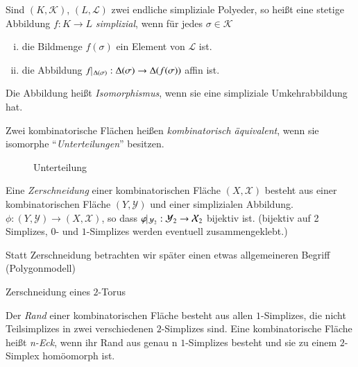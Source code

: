 \documentclass[a4paper,10pt]{scrartcl}
\begin{document}
\begin{df}
 Sind $(K, \mathcal K)$, $(L, \mathcal L)$ zwei endliche simpliziale Polyeder, so heißt eine stetige Abbildung $f: K \to L$ \emph{simplizial}, wenn für jedes $\sigma\in \mathcal K$
\begin{enumerate}[(i)]
 \item die Bildmenge $f(\sigma)$ ein Element von $\mathcal L$ ist.
 \item die Abbildung $f\vline\,_{\Delta(\sigma)}: \Delta(\sigma)\to \Delta(f(\sigma))$ affin ist.
\end{enumerate}

Die Abbildung heißt \emph{Isomorphismus}, wenn sie eine simpliziale Umkehrabbildung hat.
\end{df}
\begin{df}
 Zwei kombinatorische Flächen heißen \emph{kombinatorisch äquivalent}, wenn sie isomorphe "`\emph{Unterteilungen}"' besitzen.
\end{df}
\begin{figure}[H]
 \centering
\fixme[fig129]
\caption{Unterteilung}
\end{figure}

\begin{df}
 Eine \emph{Zerschneidung} einer kombinatorischen Fläche  $(X, \mathcal X)$ besteht aus einer kombinatorischen Fläche $(Y,\mathcal Y)$ und einer simplizialen Abbildung. $\phi:(Y, \mathcal Y)\to (X, \mathcal X)$, so dass $\phi\vline\,_{\mathcal Y_2}:\mathcal Y_2 \to \mathcal X_2$ bijektiv ist. (bijektiv auf 2 Simplizes, $0$- und $1$-Simplizes werden eventuell zusammengeklebt.)
\begin{figure}[H]
 \centering
\fixme[fig130]
\caption{}
\end{figure}
\end{df}

Statt Zerschneidung betrachten wir später einen etwas allgemeineren Begriff (Polygonmodell)
\begin{seg}{Zerschneidung eines $2$-Torus}
 \begin{figure}[H]
 \centering
\fixme[fig131]
\caption{}
\end{figure}
\end{seg}

\begin{df}
 Der \emph{Rand} einer kombinatorischen Fläche besteht aus allen $1$-Simplizes, die nicht Teilsimplizes in zwei verschiedenen $2$-Simplizes sind. Eine kombinatorische Fläche heißt \emph{n-Eck}, wenn ihr Rand aus genau n $1$-Simplizes besteht und sie zu einem $2$-Simplex homöomorph ist.
\begin{figure}[H]
 \centering
\fixme[fig132]
\caption{}
\end{figure}
\end{df}
\end{document}

